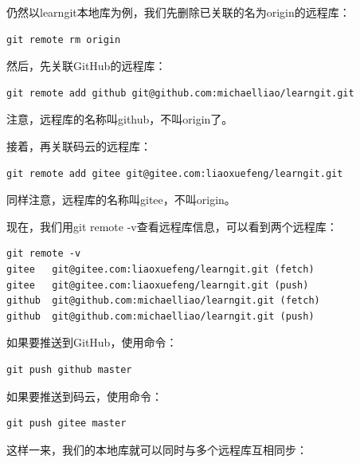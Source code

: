 仍然以learngit本地库为例，我们先删除已关联的名为origin的远程库：

\begin{verbatim}
git remote rm origin
\end{verbatim}

然后，先关联GitHub的远程库：

\begin{verbatim}
git remote add github git@github.com:michaelliao/learngit.git
\end{verbatim}

注意，远程库的名称叫github，不叫origin了。

接着，再关联码云的远程库：

\begin{verbatim}
git remote add gitee git@gitee.com:liaoxuefeng/learngit.git
\end{verbatim}

同样注意，远程库的名称叫gitee，不叫origin。

现在，我们用git remote -v查看远程库信息，可以看到两个远程库：

\begin{verbatim}
git remote -v
gitee	git@gitee.com:liaoxuefeng/learngit.git (fetch)
gitee	git@gitee.com:liaoxuefeng/learngit.git (push)
github	git@github.com:michaelliao/learngit.git (fetch)
github	git@github.com:michaelliao/learngit.git (push)
\end{verbatim}

如果要推送到GitHub，使用命令：

\begin{verbatim}
git push github master
\end{verbatim}

如果要推送到码云，使用命令：

\begin{verbatim}
git push gitee master
\end{verbatim}

这样一来，我们的本地库就可以同时与多个远程库互相同步：

